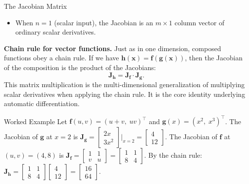\documentclass[aspectratio=169,10pt]{beamer}
\newcommand{\x}{\mathbf{x}}
\begin{document}
\begin{frame}[allowframebreaks]{The Jacobian Matrix}
\begin{itemize}
    \item When $n=1$ (scalar input), the Jacobian is an $m\times 1$ column
          vector of ordinary scalar derivatives.
  \end{itemize}

  \medskip
  \textbf{Chain rule for vector functions.}
  Just as in one dimension, composed functions obey a chain rule.  If we
  have $\mathbf{h}(\x) = \mathbf{f}(\mathbf{g}(\x))$, then the Jacobian
  of the composition is the product of the Jacobians:
  \[
    \mathbf{J}_{\mathbf{h}} = \mathbf{J}_{\mathbf{f}} \cdot \mathbf{J}_{\mathbf{g}}.
  \]
  This matrix multiplication is the multi-dimensional generalization of
  multiplying scalar derivatives when applying the chain rule.  It is
  the core identity underlying automatic differentiation.

  \begin{exampleblock}{Worked Example}
    Let $\mathbf{f}(u,v) = (u+v,\; uv)^\top$ and
    $\mathbf{g}(x) = (x^2,\; x^3)^\top$.
    The Jacobian of $\mathbf{g}$ at $x=2$ is
    $\mathbf{J}_\mathbf{g} = \begin{bmatrix}2x\\3x^2\end{bmatrix}
    \big|_{x=2} = \begin{bmatrix}4\\12\end{bmatrix}$.
    The Jacobian of $\mathbf{f}$ at $(u,v)=(4,8)$ is
    $\mathbf{J}_\mathbf{f} = \begin{bmatrix}1&1\\v&u\end{bmatrix}
    = \begin{bmatrix}1&1\\8&4\end{bmatrix}$.
    By the chain rule:
    $\mathbf{J}_\mathbf{h} = \begin{bmatrix}1&1\\8&4\end{bmatrix}
    \begin{bmatrix}4\\12\end{bmatrix} = \begin{bmatrix}16\\64\end{bmatrix}$.
  \end{exampleblock}

\end{frame}
\end{document}
